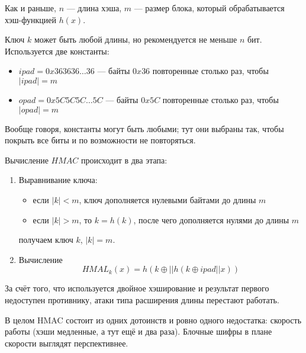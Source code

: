 Как и раньше, $n$ --- длина хэша, $m$ --- размер блока, который обрабатывается
хэш-функцией $h\left( x \right)$.

Ключ $k$ может быть любой длины, но рекомендуется не меньше $n$ бит.
Используется две константы:
\begin{itemize}
  \item $ipad=0x363636\dots 36$ --- байты $0x36$ повторенные столько раз,
    чтобы $\left| ipad \right| = m$
  \item $opad=0x5C5C5C\dots 5C$ --- байты $0x5C$ повторенные столько раз,
    чтобы $\left| opad \right| = m$
\end{itemize}

Вообще говоря, константы могут быть любыми; тут они выбраны так, чтобы
покрыть все биты и по возможности не повторяться.

Вычисление $HMAC$ происходит в два этапа:
\begin{enumerate}
  \item Выравнивание ключа:
    \begin{itemize}
      \item если $\left| k \right| < m$, ключ дополняется нулевыми байтами до
        длины $m$
      \item если $\left| k \right| > m$, то $k = h\left( k \right)$,
        после чего дополняется нулями до длины $m$
    \end{itemize}
    получаем ключ $k$, $\left| k \right| = m$.
  \item Вычисление
    \begin{equation*}
      HMAL_k\left( x \right)
      = h\left( k \mathbin{\oplus}
        || h\left( k \mathbin{\oplus} ipad || x \right) \right)
    \end{equation*}
\end{enumerate}

За счёт того, что используется двойное хэширование и результат
первого недоступен противнику, атаки типа расширения длины перестают работать.

В целом HMAC состоит из одних дотоинств и ровно одного недостатка:
скорость работы (хэши медленные, а тут ещё и два раза).
Блочные шифры в плане скорости выглядят перспективнее.
